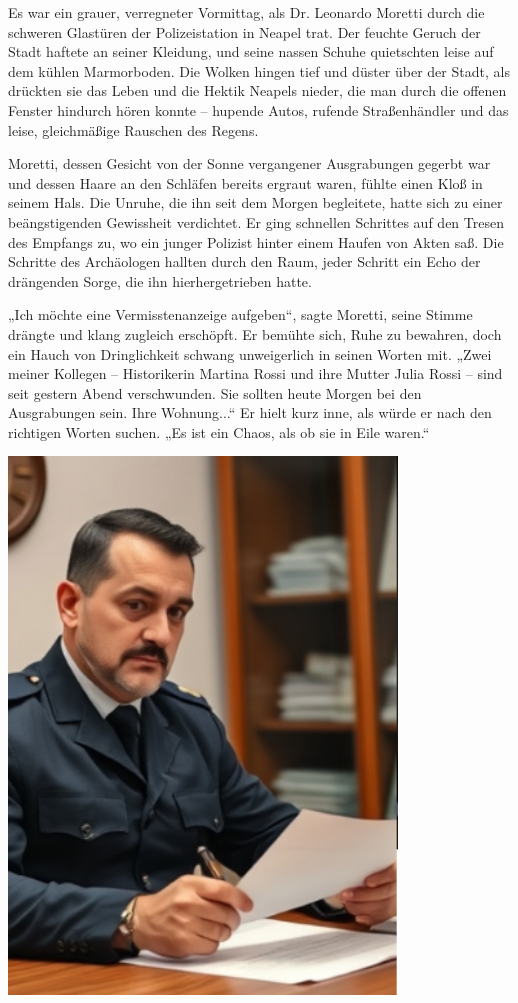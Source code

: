 \documentclass[
]{article}
\begin{document}
Es war ein grauer, verregneter Vormittag, als Dr. Leonardo Moretti durch
die schweren Glastüren der Polizeistation in Neapel trat. Der feuchte
Geruch der Stadt haftete an seiner Kleidung, und seine nassen Schuhe
quietschten leise auf dem kühlen Marmorboden. Die Wolken hingen tief und
düster über der Stadt, als drückten sie das Leben und die Hektik Neapels
nieder, die man durch die offenen Fenster hindurch hören konnte --
hupende Autos, rufende Straßenhändler und das leise, gleichmäßige
Rauschen des Regens.

Moretti, dessen Gesicht von der Sonne vergangener Ausgrabungen gegerbt
war und dessen Haare an den Schläfen bereits ergraut waren, fühlte einen
Kloß in seinem Hals. Die Unruhe, die ihn seit dem Morgen begleitete,
hatte sich zu einer beängstigenden Gewissheit verdichtet. Er ging
schnellen Schrittes auf den Tresen des Empfangs zu, wo ein junger
Polizist hinter einem Haufen von Akten saß. Die Schritte des Archäologen
hallten durch den Raum, jeder Schritt ein Echo der drängenden Sorge, die
ihn hierhergetrieben hatte.

„Ich möchte eine Vermisstenanzeige aufgeben``, sagte Moretti, seine
Stimme drängte und klang zugleich erschöpft. Er bemühte sich, Ruhe zu
bewahren, doch ein Hauch von Dringlichkeit schwang unweigerlich in
seinen Worten mit. „Zwei meiner Kollegen -- Historikerin Martina Rossi
und ihre Mutter Julia Rossi -- sind seit gestern Abend verschwunden. Sie
sollten heute Morgen bei den Ausgrabungen sein. Ihre Wohnung...`` Er
hielt kurz inne, als würde er nach den richtigen Worten suchen. „Es ist
ein Chaos, als ob sie in Eile waren.``

\includegraphics[width=4.0625in,height=5.61458in]{media/image004.png}
\end{document}
